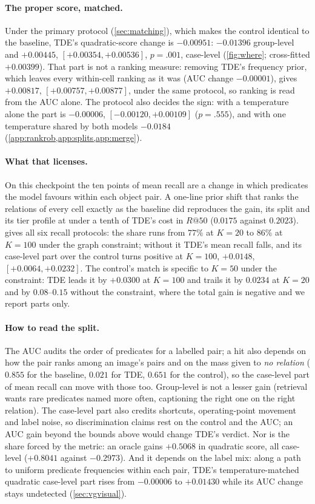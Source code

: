 \paragraph{The proper score, matched.} Under the primary protocol (\cref{sec:matching}),
which makes the control identical to the baseline, TDE's quadratic-score change is
$-0.00951$: $-0.01396$ group-level and $+0.00445$, $[+0.00354,+0.00536]$, $p=.001$, case-level
(\cref{fig:where}; cross-fitted $+0.00399$). That part is not a ranking measure: removing
TDE's frequency prior, which leaves every within-cell ranking as it was (AUC change
$-0.00001$), gives $+0.00817$, $[+0.00757,+0.00877]$, under the same protocol, so ranking is read
from the AUC alone. The protocol also decides the sign: with a temperature alone the part is
$-0.00006$, $[-0.00120,+0.00109]$ ($p=.555$), and with one temperature shared by both models
$-0.0184$ (\cref{app:rankrob,app:splits,app:merge}).

\paragraph{What that licenses.} On this checkpoint the ten points of mean recall are a change in
which predicates the model favours within each object pair. A one-line prior shift that ranks
the relations of every cell exactly as the baseline did reproduces the gain, its split and
its tier profile at under a tenth of TDE's cost in $R@50$ ($0.0175$ against $0.2023$).
 gives all six recall protocols: the share runs from $77\%$ at
$K=20$ to $86\%$ at $K=100$ under the graph constraint; without it TDE's mean recall falls,
and its case-level part over the control turns positive at $K=100$, $+0.0148$,
$[+0.0064,+0.0232]$. The control's match is specific to $K=50$ under the constraint: TDE leads it by $+0.0300$ at
$K=100$ and trails it by $0.0234$ at $K=20$ and by $0.08$--$0.15$ without the constraint, where
the total gain is negative and we report parts only.

\paragraph{How to read the split.} The AUC audits the order of predicates for a labelled pair;
a hit also depends on how the pair ranks among an image's pairs and on the mass given to
\emph{no relation} ($0.855$ for the baseline, $0.021$ for TDE, $0.651$ for the control), so the
case-level part of mean recall can move with those too. Group-level is not a lesser gain (retrieval wants rare predicates named more often, captioning the right one on the right relation). The case-level part also credits shortcuts, operating-point
movement and label noise, so discrimination claims rest on the control and the AUC; an AUC gain
beyond the bounds above would change TDE's verdict. Nor is the share forced by
the metric: an oracle gains $+0.5068$ in quadratic score, all case-level ($+0.8041$ against
$-0.2973$). And it depends on the label mix: along a path to uniform predicate frequencies
within each pair, TDE's temperature-matched quadratic case-level part rises from $-0.00006$ to $+0.01430$
while its AUC change stays undetected (\cref{sec:vgvisual}).

